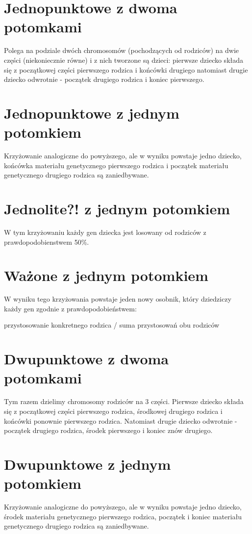 \documentclass[11pt]{aghdpl}
\begin{document}
\section{Jednopunktowe z dwoma potomkami}
\label{sec:jedenDwa}
Polega na podziale dwóch chromosomów (pochodzących od rodziców) na dwie części (niekoniecznie równe) i z nich tworzone są dzieci: pierwsze dziecko składa się z początkowej części pierwszego rodzica i końcówki drugiego natomiast drugie dziecko odwrotnie - początek drugiego rodzica i koniec pierwszego.

\section{Jednopunktowe z jednym potomkiem}
\label{sec:jedenJeden}
Krzyżowanie analogiczne do powyższego, ale w wyniku powstaje jedno dziecko, końcówka materiału genetycznego pierwszego rodzica i początek materiału genetycznego drugiego rodzica są zaniedbywane.

\section{Jednolite?! z jednym potomkiem}
\label{sec:uniform}
W tym krzyżowaniu każdy gen dziecka jest losowany od rodziców z prawdopodobienstwem 50\%.

\section{Ważone z jednym potomkiem}
\label{sec:wazone}
W wyniku tego krzyżowania powstaje jeden nowy osobnik, który dziedziczy każdy gen zgodnie z prawdopodobieństwem:
\begin{center}
przystosowanie konkretnego rodzica / suma przystosowań obu rodziców
\end{center}

\section{Dwupunktowe z dwoma potomkami}
\label{sec:dwaDwa}
Tym razem dzielimy chromosomy rodziców na 3 części. Pierwsze dziecko składa się z początkowej części pierwszego rodzica, środkowej drugiego rodzica i końcówki ponownie pierwszego rodzica. Natomiast drugie dziecko odwrotnie - początek drugiego rodzica, środek pierwszego i koniec znów drugiego.

\section{Dwupunktowe z jednym potomkiem}
\label{sec:dwaJeden}
Krzyżowanie analogiczne do powyższego, ale w wyniku powstaje jedno dziecko, środek materiału genetycznego pierwszego rodzica, początek i koniec materiału genetycznego drugiego rodzica są zaniedbywane.
\end{document}

